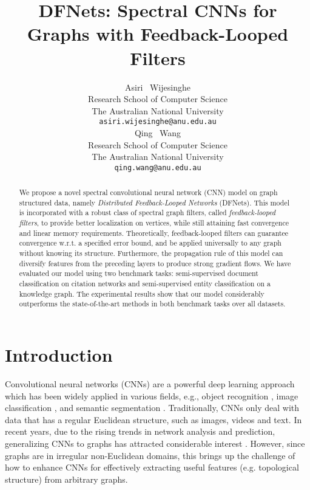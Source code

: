\documentclass{article}
\title{DFNets: Spectral CNNs for Graphs with Feedback-Looped Filters}
\author{Asiri ~Wijesinghe\\ Research School of Computer Science\\
  The Australian National University\\
  \texttt{asiri.wijesinghe@anu.edu.au} \\
  \And
  Qing ~Wang \\
  Research School of Computer Science\\
  The Australian National University\\
  \texttt{qing.wang@anu.edu.au} \\
}
\begin{document}
\maketitle

\begin{abstract}
We propose a novel spectral convolutional neural network (CNN) model on graph structured data, namely \emph{Distributed Feedback-Looped Networks} (DFNets). This model is incorporated with a robust class of spectral graph filters, called \emph{feedback-looped filters}, to provide better localization on vertices, while still attaining fast convergence and linear memory requirements. Theoretically, feedback-looped filters can guarantee convergence w.r.t. a specified error bound, and be applied universally to any graph without knowing its structure. Furthermore, the propagation rule of this model can diversify features from the preceding layers to produce strong gradient flows. We have evaluated our model using two benchmark tasks: semi-supervised document classification on citation networks and semi-supervised entity classification on a knowledge graph. The experimental results show that our model considerably outperforms the state-of-the-art methods in both benchmark tasks over all datasets.
\end{abstract}



\section{Introduction}
\vspace{-0.2cm}
Convolutional neural networks (CNNs) \cite{krizhevsky2012imagenet} are a powerful deep learning approach which has been widely applied in various fields, e.g., object recognition \cite{sharif2014cnn}, image classification \cite{hu2015deep}, and semantic segmentation \cite{li2017fully}. Traditionally, CNNs only deal with data that has a regular Euclidean structure, such as images, videos and text. In recent years, due to the rising trends in network analysis and prediction, generalizing CNNs to graphs has attracted considerable interest \cite{bruna2013spectral,defferrard2016convolutional,hamilton2017inductive,perozzi2014deepwalk}. However, since graphs are in irregular non-Euclidean domains, this brings
up the challenge of how to enhance CNNs for effectively extracting useful features (e.g. topological structure) from arbitrary graphs.
\end{document}
